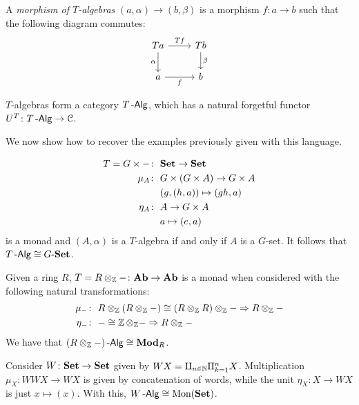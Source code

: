\documentclass[a4paper,11pt,oneside,openany]{scrbook}
\begin{document}
	\begin{defn}
		A \emph{morphism of $T$-algebras} $(a,\alpha)\rightarrow (b,\beta)$ is a morphism $f\colon a\rightarrow b$ such that the following diagram commutes:
		\[
			\begin{tikzcd}
				Ta\arrow["\alpha"']{d}\arrow["Tf"]{r}
				& Tb\arrow["\beta"]{d} \\
				a\arrow["f"']{r}
				& b
			\end{tikzcd}
		\]
	\end{defn}

		
	$T$-algebras form a category $T\operatorname{-\mathsf{Alg}}$, which has a natural forgetful functor $U^T\colon T\operatorname{-\mathsf{Alg}}\rightarrow\operatorname{\mathcal{C}}$.
	
	We now show how to recover the examples previously given with this language.
	
	\begin{exmp}
		\begin{align*}
			T=G\times - \colon&\ {\normalfont\textbf{Set}} \rightarrow{\normalfont\textbf{Set}} \\
			\mu_A\colon&\ G\times (G\times A) \rightarrow G\times A \\
			&\ (g,(h,a)) \mapsto (gh,a) \\
			\eta_A\colon&\ A \rightarrow G\times A \\
			&\ a \mapsto (e,a)
		\end{align*}
		is a monad and $(A,\alpha)$ is a $T$-algebra if and only if $A$ is a $G$-set. It follows that $T\operatorname{-\mathsf{Alg}}\cong G\mbox{-}{\normalfont\textbf{Set}}$.
	\end{exmp}

	\begin{exmp}
		Given a ring $R$, $T=R\otimes_{\operatorname{\mathbb{Z}}}-\colon {\normalfont\textbf{Ab}}\rightarrow {\normalfont\textbf{Ab}}$ is a monad when considered with the following natural transformations:
		\begin{align*}
			\mu_{-}\colon &\ R\otimes_{\operatorname{\mathbb{Z}}}(R\otimes_{\operatorname{\mathbb{Z}}}-)\cong (R\otimes_{\operatorname{\mathbb{Z}}}R)\otimes_{\operatorname{\mathbb{Z}}}-\Rightarrow R\otimes_{\operatorname{\mathbb{Z}}}- \\
			\eta_-\colon &\ -\cong\operatorname{\mathbb{Z}}\otimes_{\operatorname{\mathbb{Z}}}-\Rightarrow R\otimes_{\operatorname{\mathbb{Z}}}-
		\end{align*}
	We have that $(R\otimes_{\operatorname{\mathbb{Z}}}-)\operatorname{-\mathsf{Alg}}\cong{\normalfont\textbf{Mod}}_R$.
	\end{exmp}

	\begin{exmp}
		Consider $W\colon{\normalfont\textbf{Set}}\rightarrow{\normalfont\textbf{Set}}$ given by $WX=\amalg_{n\in\operatorname{\mathbb{N}}}\Pi_{k=1}^n X$. Multiplication $\mu_X\colon WWX\rightarrow WX$ is given by concatenation of words, while the unit $\eta_X\colon X\rightarrow WX$ is just $x\mapsto (x)$. With this, $W\operatorname{-\mathsf{Alg}}\cong \text{Mon}({\normalfont\textbf{Set}})$.
	\end{exmp}
\end{document}
